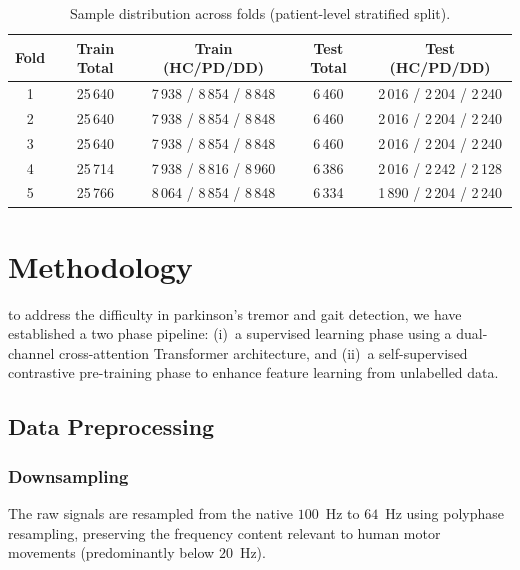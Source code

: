 \documentclass[conference]{IEEEtran}
\begin{document}
\begin{table}[H]
\centering
\caption{Sample distribution across folds (patient-level stratified split).}
\label{tab:folds}
\begin{tabular}{ccccc}
\toprule
\textbf{Fold} & \textbf{Train Total} & \textbf{Train (HC/PD/DD)} & \textbf{Test Total} & \textbf{Test (HC/PD/DD)} \\
\midrule
1 & 25\,640 & 7\,938 / 8\,854 / 8\,848 & 6\,460 & 2\,016 / 2\,204 / 2\,240 \\
2 & 25\,640 & 7\,938 / 8\,854 / 8\,848 & 6\,460 & 2\,016 / 2\,204 / 2\,240 \\
3 & 25\,640 & 7\,938 / 8\,854 / 8\,848 & 6\,460 & 2\,016 / 2\,204 / 2\,240 \\
4 & 25\,714 & 7\,938 / 8\,816 / 8\,960 & 6\,386 & 2\,016 / 2\,242 / 2\,128 \\
5 & 25\,766 & 8\,064 / 8\,854 / 8\,848 & 6\,334 & 1\,890 / 2\,204 / 2\,240 \\
\bottomrule
\end{tabular}
\end{table}

\section{Methodology}

to address the difficulty in parkinson's tremor and gait detection, we have established a two phase pipeline: (i)~a supervised learning phase using a dual-channel cross-attention Transformer architecture,
and (ii)~a self-supervised contrastive pre-training phase to enhance feature learning from unlabelled data.

\subsection{Data Preprocessing}

\subsubsection{Downsampling}
The raw signals are resampled from the native $100$~Hz to $64$~Hz using polyphase resampling, preserving the frequency content relevant to human motor movements (predominantly below $20$~Hz).
\end{document}
